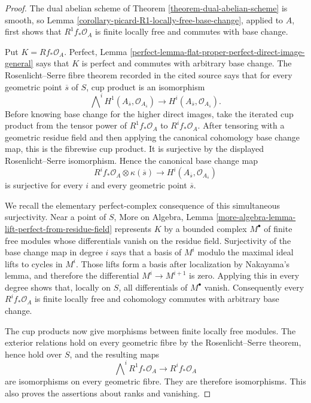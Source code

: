 \begin{proof}
The dual abelian scheme of Theorem \ref{theorem-dual-abelian-scheme} is smooth,
so Lemma \ref{corollary-picard-R1-locally-free-base-change}, applied to $A$,
first shows that $R^1f_*\mathcal{O}_A$ is finite locally free and commutes with
base change.

Put $K=Rf_*\mathcal{O}_A$. Perfect, Lemma
\ref{perfect-lemma-flat-proper-perfect-direct-image-general} says that $K$ is
perfect and commutes with arbitrary base change. The Rosenlicht--Serre fibre
theorem recorded in the cited source says that for every geometric point
$\overline{s}$ of $S$, cup product is an isomorphism
$$
\bigwedge\nolimits^i
H^1(A_{\overline{s}},\mathcal{O}_{A_{\overline{s}}})
\longrightarrow
H^i(A_{\overline{s}},\mathcal{O}_{A_{\overline{s}}}).
$$
Before knowing base change for the higher direct images, take the iterated cup
product from the tensor power of $R^1f_*\mathcal{O}_A$ to $R^if_*\mathcal{O}_A$.
After tensoring with a geometric residue field and then applying the canonical
cohomology base change map, this is the fibrewise cup product. It is
surjective by the displayed Rosenlicht--Serre isomorphism. Hence the canonical
base change map
$$
R^if_*\mathcal{O}_A\otimes\kappa(\overline{s})
\longrightarrow H^i(A_{\overline{s}},\mathcal{O}_{A_{\overline{s}}})
$$
is surjective for every $i$ and every geometric point $\overline{s}$.

We recall the elementary perfect-complex consequence of this simultaneous
surjectivity. Near a point of $S$, More on Algebra, Lemma
\ref{more-algebra-lemma-lift-perfect-from-residue-field} represents $K$ by a
bounded complex $M^\bullet$ of finite free modules whose differentials vanish
on the residue field. Surjectivity of the base change map in degree $i$ says
that a basis of $M^i$ modulo the maximal ideal lifts to cycles in $M^i$.
Those lifts form a basis after localization by Nakayama's lemma, and therefore
the differential $M^i\to M^{i+1}$ is zero. Applying this in every degree shows
that, locally on $S$, all differentials of $M^\bullet$ vanish. Consequently
every $R^if_*\mathcal{O}_A$ is finite locally free and cohomology commutes with
arbitrary base change.

The cup products now give morphisms between finite locally free modules. The
exterior relations hold on every geometric fibre by the Rosenlicht--Serre
theorem, hence hold over $S$, and the resulting maps
$$
\bigwedge\nolimits^iR^1f_*\mathcal{O}_A
\longrightarrow R^if_*\mathcal{O}_A
$$
are isomorphisms on every geometric fibre. They are therefore isomorphisms.
This also proves the assertions about ranks and vanishing.
\end{proof}

